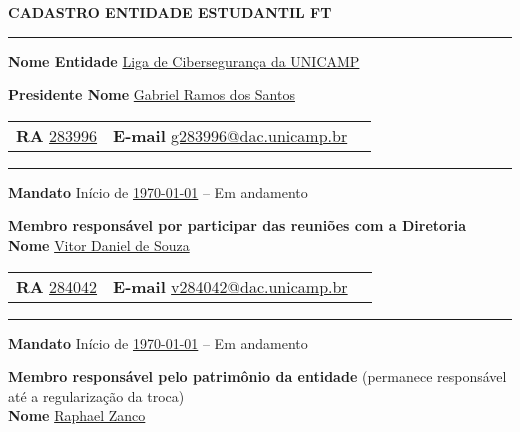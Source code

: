 \documentclass[10pt, a4paper]{article}
\begin{document}
\small

\begin{center}
    \large\textbf{CADASTRO ENTIDADE ESTUDANTIL FT}
\end{center}

\vspace{0.2cm}
\hrule
\vspace{0.2cm}

\textbf{Nome Entidade} \hspace{1cm} \underline{Liga de Cibersegurança da UNICAMP}

\vspace{0.3cm}
\textbf{Presidente Nome} \hspace{1.5cm} \underline{Gabriel Ramos dos Santos}

\vspace{0.2cm}
\begin{tabularx}{\textwidth}{@{}X X X@{}}
    \textbf{RA} \hspace{0.5cm} \underline{283996} &
    \textbf{E-mail} \hspace{0.5cm} \underline{g283996@dac.unicamp.br}
\end{tabularx}

\vspace{0.2cm}
\hrule
\vspace{0.2cm}

\textbf{Mandato} Início de \underline \today{} -- Em andamento

\vspace{0.4cm}
\textbf{Membro responsável por participar das reuniões com a Diretoria} \\
\textbf{Nome} \hspace{1.5cm} \underline{Vitor Daniel de Souza}

\vspace{0.2cm}
\begin{tabularx}{\textwidth}{@{}X X X@{}}
    \textbf{RA} \hspace{0.5cm} \underline{284042} &
    \textbf{E-mail} \hspace{0.5cm} \underline{v284042@dac.unicamp.br}
\end{tabularx}

\vspace{0.2cm}
\hrule
\vspace{0.2cm}

\textbf{Mandato} Início de \underline{\today}{} -- Em andamento

\vspace{0.4cm}
\textbf{Membro responsável pelo patrimônio da entidade} {\scriptsize(permanece responsável até a regularização da troca)} \\
\textbf{Nome} \hspace{1.5cm} \underline{Raphael Zanco}
\end{document}
